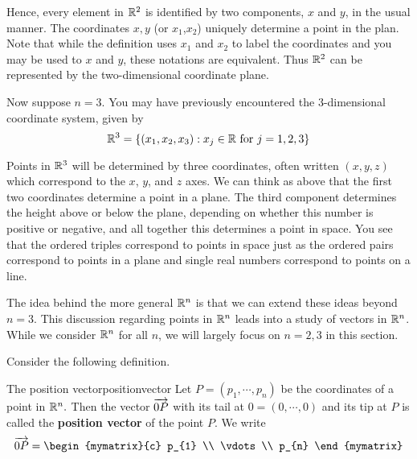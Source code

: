 Hence, every element in $\mathbb{R}^2$ is identified by two
components, $x$ and $y$, in the usual manner. The coordinates $x, y$ (or $x_1$,$x_2$) uniquely determine a point in the plan. Note that while the definition uses $x_1$ and $x_2$ to label the coordinates and you may be used to $x$ and $y$, these notations are equivalent. Thus $\mathbb{R}^2$ can be represented by the two-dimensional coordinate plane.

Now suppose $n=3$. You may have previously encountered the $3$-dimensional
coordinate system, given by
\begin{equation*}
\mathbb{R}^{3}=
\left\{ \left( x_{1}, x_{2}, x_{3}\right)
:x_{j}\in \mathbb{R}\mbox{ for }j=1,2,3 \right\}
\end{equation*}

Points in $\mathbb{R}^3$ will be determined by three
coordinates, often written $\left(x,y,z\right)$ which correspond to the $x$, $y$,
and $z$ axes.  We can think as above that the first two coordinates
determine a point in a plane. The third component determines the
height above or below the plane, depending on whether this number is
positive or negative, and all together this determines a point in
space. You
see that the ordered triples correspond to points in space just as the
ordered pairs correspond to points in a plane and single real numbers
correspond to points on a line.

The idea behind the more general $\mathbb{R}^n$ is that we can extend
these ideas beyond $n = 3.$ This discussion regarding points in $\mathbb{R}^n$ leads into a study of vectors in $\mathbb{R}^n$. While we consider $\mathbb{R}^n$ for all $n$,
we will largely  focus on $n=2,3$ in this section. 

Consider the following definition.

\begin{definition}{The position vector}{positionvector}
Let $P=\left( p_{1},\cdots ,p_{n}\right) $ be the coordinates of a
point in $\mathbb{R}^{n}.$ Then the vector $\overrightarrow{0P}$ with its tail at
$0=\left( 0,\cdots ,0\right) $ and its tip at 
$P$ is called the \textbf{position vector} of the point $P$. 
We write 
\begin{equation*}
\longvect{0P} = \begin{mymatrix}{c}
p_{1} \\
\vdots \\
p_{n}
\end{mymatrix}
\end{equation*}
\end{definition}

